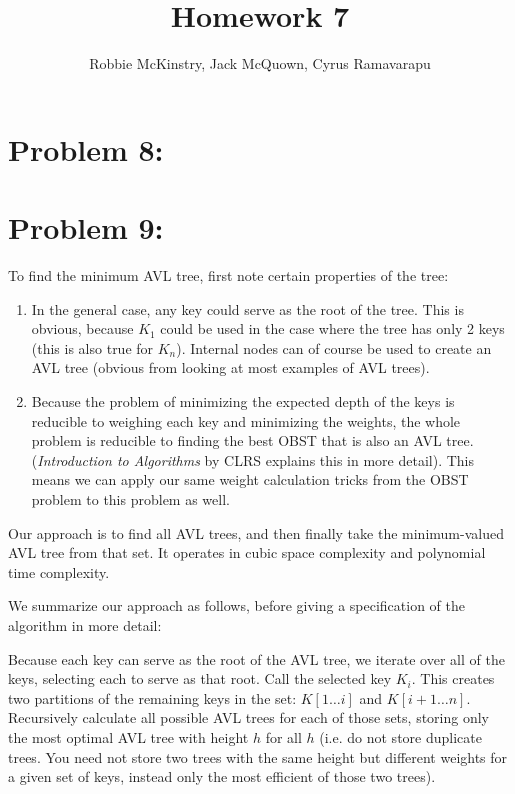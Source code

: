 \documentclass[12pt]{article}
\begin{document}
\title{Homework 7}
\author{Robbie McKinstry, Jack McQuown, Cyrus Ramavarapu}
\renewcommand{\today}{19 September 2016}
\renewcommand{\baselinestretch}{1.5}
\maketitle

\section*{Problem 8: }
\section*{Problem 9: }

To find the minimum AVL tree, first note certain properties of the tree:

\begin{enumerate}
	\item In the general case, any key could serve as the root of the tree. This is obvious, because $K_1$ could be used in the case where the tree has only 2 keys (this is also true for $K_n$). Internal nodes can of course be used to create an AVL tree (obvious from looking at most examples of AVL trees).
	\item Because the problem of minimizing the expected depth of the keys is reducible to weighing each key and minimizing the weights, the whole problem is reducible to finding the best OBST that is also an AVL tree. (\textit{Introduction to Algorithms} by CLRS explains this in more detail). This means we can apply our same weight calculation tricks from the OBST problem to this problem as well.
\end{enumerate}

Our approach is to find all AVL trees, and then finally take the minimum-valued AVL tree from that set. It operates in cubic space complexity and polynomial time complexity.

We summarize our approach as follows, before giving a specification of the algorithm in more detail:

Because each key can serve as the root of the AVL tree, we iterate over all of the keys, selecting each to serve as that root. Call the selected key $K_i$. This creates two partitions of the remaining keys in the set: $K[1\dots i]$ and $K[i+1 \dots n]$. Recursively calculate all possible AVL trees for each of those sets, storing only the most optimal AVL tree with height $h$ for all $h$ (i.e. do not store duplicate trees. You need not store two trees with the same height but different weights for a given set of keys, instead only the most efficient of those two trees). 
\end{document}
